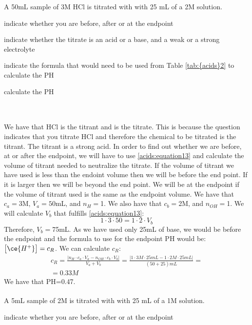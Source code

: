 \documentclass[main.tex]{subfiles}
\newcommand\chapterlabel{acids}
\begin{document}
\begin{description}
\begin{example} %
A 50mL sample of 3M HCl is titrated with with 25 mL of a  2M solution. \begin{inparaenum}[(a)] 
\item indicate whether you are before, after or at the endpoint
\item indicate whether the titrate is an acid or a base, and a weak or a strong electrolyte
\item indicate the formula that would need to be used from Table \ref{tab:{\chapterlabel}2} to calculate the PH 
\item calculate the PH 
\end{inparaenum}
\\
\\
We have that HCl is the titrant and  is the titrate. This is because the question indicates that you titrate HCl and therefore the chemical to be titrated is the titrant. The titrant is a strong acid. In order to find out whether we are before, at or after the endpoint, we will have to use \ref{\chapterlabel:equation13} and calculate the volume of titrant needed to neutralize the titrate. If the volume of titrant we have used is less than the endoint volume then we will be before the end point. If it is larger then we will be beyond the end point. We will be at the endpoint if the volume of titrant used is the same as the endpoint volume. We have that $c_a=$3M, $V_a=50$mL, and $n_{H}=$1. We also have that $c_b=$2M, and $n_{OH}=$1. We will calculate $V_b$ that fulfills \ref{\chapterlabel:equation13}:
\[  1\cdot 3\cdot 50=1\cdot 2\cdot V_b \]
Therefore, $V_b=$75mL. As we have used only 25mL of base, we would be before the endpoint and the formula to use for the endpoint PH would be: $\big[ \ce{H^+} \big]= c_{R}$. We can calculate $c_{R}$:
\[\begin{split}c_R=\frac{\rvert n_{H}\cdot c_a\cdot V_a -n_{OH}\cdot c_b\cdot V_b \lvert}{V_a+V_b}=\frac{\rvert 1\cdot 3M\cdot 25mL -1\cdot 2M\cdot 25mL \lvert}{(50+25)mL}=\\=0.33M\end{split} \]
We have that PH=0.47.
\\
\faDiamond\ \\
A 5mL sample of 2M  is titrated with with 25 mL of a  1M solution. \begin{inparaenum}[(a)] 
\item indicate whether you are before, after or at the endpoint

\end{inparaenum}
\end{example}
\end{description}
\end{document}
